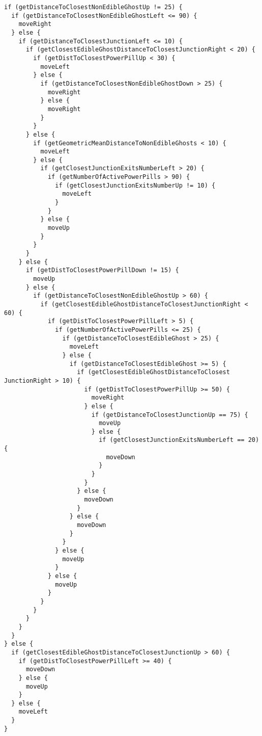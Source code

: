 \begin{lstlisting}[caption={Ejemplo de bot típico producido usando la gramática de bajo nivel entrenado contra Random Ghosts.}]
if (getDistanceToClosestNonEdibleGhostUp != 25) {
  if (getDistanceToClosestNonEdibleGhostLeft <= 90) {
    moveRight
  } else {
    if (getDistanceToClosestJunctionLeft <= 10) {
      if (getClosestEdibleGhostDistanceToClosestJunctionRight < 20) {
        if (getDistToClosestPowerPillUp < 30) {
          moveLeft
        } else {
          if (getDistanceToClosestNonEdibleGhostDown > 25) {
            moveRight
          } else {
            moveRight
          }
        }
      } else {
        if (getGeometricMeanDistanceToNonEdibleGhosts < 10) {
          moveLeft
        } else {
          if (getClosestJunctionExitsNumberLeft > 20) {
            if (getNumberOfActivePowerPills > 90) {
              if (getClosestJunctionExitsNumberUp != 10) {
                moveLeft
              }
            }
          } else {
            moveUp
          }
        }
      }
    } else {
      if (getDistToClosestPowerPillDown != 15) {
        moveUp
      } else {
        if (getDistanceToClosestNonEdibleGhostUp > 60) {
          if (getClosestEdibleGhostDistanceToClosestJunctionRight < 60) {
            if (getDistToClosestPowerPillLeft > 5) {
              if (getNumberOfActivePowerPills <= 25) {
                if (getDistanceToClosestEdibleGhost > 25) {
                  moveLeft
                } else {
                  if (getDistanceToClosestEdibleGhost >= 5) {
                    if (getClosestEdibleGhostDistanceToClosest JunctionRight > 10) {
                      if (getDistToClosestPowerPillUp >= 50) {
                        moveRight
                      } else {
                        if (getDistanceToClosestJunctionUp == 75) {
                          moveUp
                        } else {
                          if (getClosestJunctionExitsNumberLeft == 20) {
                            moveDown
                          }
                        }
                      }
                    } else {
                      moveDown
                    }
                  } else {
                    moveDown
                  }
                }
              } else {
                moveUp
              }
            } else {
              moveUp
            }
          }
        }
      }
    }
  }
} else {
  if (getClosestEdibleGhostDistanceToClosestJunctionUp > 60) {
    if (getDistToClosestPowerPillLeft >= 40) {
      moveDown
    } else {
      moveUp
    }
  } else {
    moveLeft
  }
}
\end{lstlisting}

